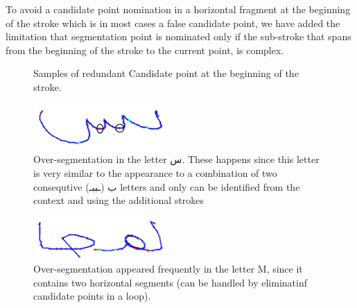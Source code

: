 \documentclass[journal,compsoc]{IEEEtran}
\begin{document}
To avoid a candidate point nomination in a horizontal fragment at the beginning of the stroke which is in most cases a false candidate point, we have added the limitation that segmentation point is nominated only if the sub-stroke that spans from the beginning of the stroke to the current point, is complex.
\begin{figure}[h]
\centering
    \caption{Samples of redundant Candidate point at the beginning of the  stroke.}
   \label{fig:oversegmentation_begin}
\end{figure}

\begin{figure}[h]
\centering
\includegraphics[width=5cm]{./figures/oversegmentation_s}
\caption{Over-segmentation in the letter س. These happens since this letter is very similar to the appearance to a combination of two consequtive ب (ـببـ) letters and only can be identified from the context and using the additional strokes }
\label{fig:oversegmentation_s}
\end{figure}

\begin{figure}[h]
\centering
\includegraphics[width=5cm]{./figures/oversegmentation_m}
\caption{Over-segmentation appeared frequently in the letter M, since it contains two horizontal segments (can be handled by eliminatinf candidate points in a loop).}
\label{fig:oversegmentation_m}
\end{figure}
\end{document}
